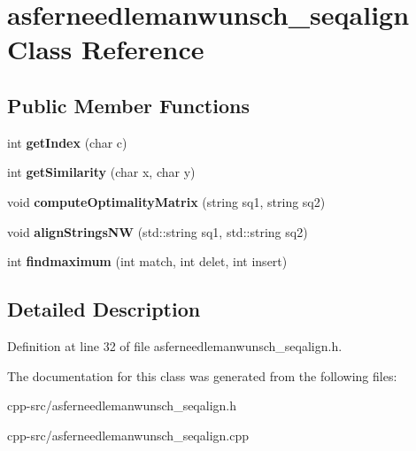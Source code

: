 \hypertarget{classasferneedlemanwunsch__seqalign}{\section{asferneedlemanwunsch\-\_\-seqalign Class Reference}
\label{classasferneedlemanwunsch__seqalign}
}
\subsection*{Public Member Functions}
\begin{DoxyCompactItemize}
\item 
\hypertarget{classasferneedlemanwunsch__seqalign_a10e24490adf1783aea93ef4e01e4d79a}{int {\bfseries get\-Index} (char c)}\label{classasferneedlemanwunsch__seqalign_a10e24490adf1783aea93ef4e01e4d79a}

\item 
\hypertarget{classasferneedlemanwunsch__seqalign_a271185619bc55ee04e84af4d3d8c7465}{int {\bfseries get\-Similarity} (char x, char y)}\label{classasferneedlemanwunsch__seqalign_a271185619bc55ee04e84af4d3d8c7465}

\item 
\hypertarget{classasferneedlemanwunsch__seqalign_a40914226f800fc606dd534a9bdef2c1f}{void {\bfseries compute\-Optimality\-Matrix} (string sq1, string sq2)}\label{classasferneedlemanwunsch__seqalign_a40914226f800fc606dd534a9bdef2c1f}

\item 
\hypertarget{classasferneedlemanwunsch__seqalign_a337da4fc154c0d375ca6ea5bd1d31893}{void {\bfseries align\-Strings\-N\-W} (std\-::string sq1, std\-::string sq2)}\label{classasferneedlemanwunsch__seqalign_a337da4fc154c0d375ca6ea5bd1d31893}

\item 
\hypertarget{classasferneedlemanwunsch__seqalign_afca37e116864965d80e90d828d1a8808}{int {\bfseries findmaximum} (int match, int delet, int insert)}\label{classasferneedlemanwunsch__seqalign_afca37e116864965d80e90d828d1a8808}

\end{DoxyCompactItemize}


\subsection{Detailed Description}


Definition at line 32 of file asferneedlemanwunsch\-\_\-seqalign.\-h.



The documentation for this class was generated from the following files\-:\begin{DoxyCompactItemize}
\item 
cpp-\/src/asferneedlemanwunsch\-\_\-seqalign.\-h\item 
cpp-\/src/asferneedlemanwunsch\-\_\-seqalign.\-cpp\end{DoxyCompactItemize}
